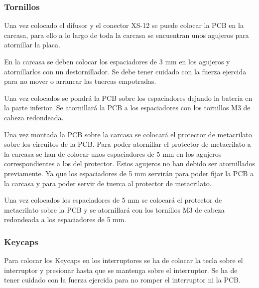 \subsubsection{Tornillos}
Una vez colocado el difusor y el conector XS-12 se puede colocar la \gls{PCB} en la carcasa, para ello a lo largo de toda la carcasa se encuentran unos agujeros para atornillar la placa.

En la carcasa se deben colocar los espaciadores de 3 mm en los agujeros y atornillarlos con un destornillador. Se debe tener cuidado con la fuerza ejercida para no mover o arrancar las tuercas empotradas.

Una vez colocados se pondrá la \gls{PCB} sobre los espaciadores dejando la batería en la parte inferior. Se atornillará la \gls{PCB} a los espaciadores con los tornillos M3 de cabeza redondeada.

Una vez montada la \gls{PCB} sobre la carcasa se colocará el protector de metacrilato sobre los circuitos de la \gls{PCB}. Para poder atornillar el protector de metacrilato a la carcasa se han de colocar unos espaciadores de 5 mm en los agujeros correspondientes a los del protector. Estos agujeros no han debido ser atornillados previamente. Ya que los espaciadores de 5 mm servirán para poder fijar la \gls{PCB} a la carcasa y para poder servir de tuerca al protector de metacrilato.

Una vez colocados los espaciadores de 5 mm se colocará el protector de metacrilato sobre la \gls{PCB} y se atornillará con los tornillos M3 de cabeza redondeada a los espaciadores de 5 mm.

\subsubsection{\gls{Keycaps}}
Para colocar los \gls{Keycaps} en los interruptores se ha de colocar la tecla sobre el interruptor y presionar hasta que se mantenga sobre el interruptor. Se ha de tener cuidado con la fuerza ejercida para no romper el interruptor ni la \gls{PCB}.